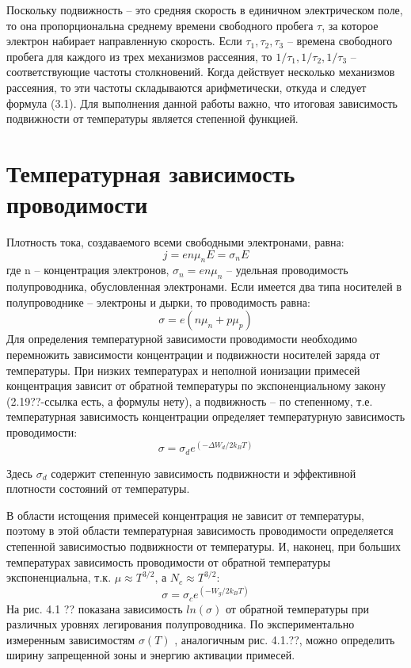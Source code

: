 Поскольку подвижность – это средняя скорость в единичном электрическом поле, то она пропорциональна среднему времени
свободного пробега $\tau$, за которое электрон набирает направленную скорость. Если $\tau_1, \tau_2,\tau_3$ – времена свободного
пробега для каждого из трех механизмов рассеяния, то $1/\tau_1,1/\tau_2,1/\tau_3$ – соответствующие частоты столкновений. Когда
действует несколько механизмов рассеяния, то эти частоты складываются арифметически, откуда и следует формула (3.1). Для
выполнения данной работы важно, что итоговая зависимость подвижности от температуры является степенной функцией.

\section{Температурная зависимость проводимости}
Плотность тока, создаваемого всеми свободными электронами, равна:
\begin{equation}
	j=e n \mu_{n} E=\sigma_{n} E
	\label{eq:4.1}
\end{equation}
где n – концентрация электронов, $\sigma_n = e n \mu_n$ – удельная проводимость полупроводника, обусловленная электронами.
Если имеется два типа носителей в полупроводнике – электроны и дырки,
то проводимость равна:
\begin{equation}
	\sigma=e\left(n \mu_{n}+p \mu_{p}\right)
	\label{eq:4.2}
\end{equation}
Для определения температурной зависимости проводимости необходимо перемножить зависимости концентрации и подвижности носителей заряда от
температуры. При низких температурах и неполной ионизации примесей концентрация зависит от обратной температуры по экспоненциальному закону
(2.19??-ссылка есть, а формулы нету), а подвижность – по степенному, т.е. температурная зависимость концентрации определяет температурную зависимость проводимости:
\begin{equation}
	\sigma=\sigma_{d} e^{\left(-\Delta W_{d} / 2 k_{B} T\right)}
	\label{eq:4.3}
\end{equation}

Здесь $\sigma_d$ содержит степенную зависимость подвижности и эффективной плотности состояний от температуры.

В области истощения примесей концентрация не зависит от температуры, поэтому в этой области температурная зависимость проводимости определяется
степенной зависимостью подвижности от температуры. И, наконец, при больших температурах зависимость проводимости от
обратной температуры экспоненциальна, т.к. $\mu \approx T^{3/2}$, а  $N_c \approx T^{3/2}$:
 \begin{equation}
	\sigma=\sigma_{c} e^{\left(-W_{g} / 2 k_{B} T\right)}
	 \label{eq:4.4}
 \end{equation}
 На рис. 4.1 ?? показана зависимость $ln(\sigma)$ от обратной температуры при различных уровнях легирования полупроводника. По
 экспериментально измеренным зависимостям $\sigma(T)$ , аналогичным рис. 4.1.??, можно определить ширину запрещенной зоны и
 энергию активации примесей. 

